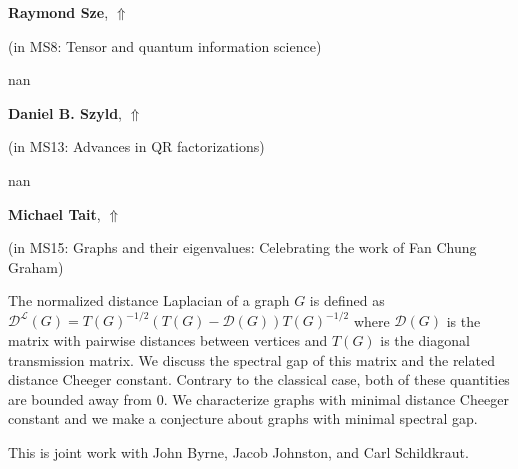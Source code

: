 \documentclass[ILAS2025-program.tex]{subfiles}
\begin{document}
     \hypertarget{down0250}{}\begin{ilasabstract}
    
    \textbf{Raymond Sze},  \hfill \hyperlink{up0250}{$\Uparrow$}
    
    (in {\color{mstitle}MS8: Tensor and quantum information science})
        
        \mtskip
    nan\end{ilasabstract}
     \hypertarget{down0339}{}\begin{ilasabstract}
    
    \textbf{Daniel B. Szyld},  \hfill \hyperlink{up0339}{$\Uparrow$}
    
    (in {\color{mstitle}MS13: Advances in QR factorizations})
        
        \mtskip
    nan\end{ilasabstract}
     \hypertarget{down0061}{}\begin{ilasabstract}
    
    \textbf{Michael Tait},  \hfill \hyperlink{up0061}{$\Uparrow$}
    
    (in {\color{mstitle}MS15: Graphs and their eigenvalues: Celebrating the work of Fan Chung Graham})
        
        \mtskip
    The normalized distance Laplacian of a graph $G$ is defined as $\mathcal{D}^\mathcal{L}(G)=T(G)^{-1/2}(T(G)-\mathcal{D}(G))T(G)^{-1/2}$ where $\mathcal{D}(G)$ is the matrix with pairwise distances between vertices and $T(G)$ is the diagonal transmission matrix. We discuss the spectral gap of this matrix and the related distance Cheeger constant. Contrary to the classical case, both of these quantities are bounded away from $0$. We characterize graphs with minimal distance Cheeger constant and we make a conjecture about graphs with minimal spectral gap. 
 
This is joint work with John Byrne, Jacob Johnston, and Carl Schildkraut.\end{ilasabstract}
\end{document}
